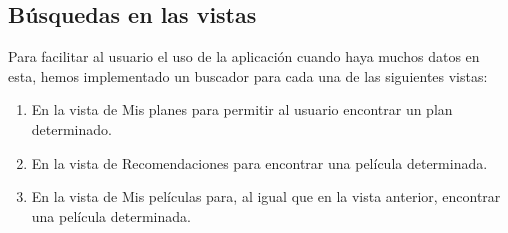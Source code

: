 \subsection{Búsquedas en las vistas}
Para facilitar al usuario el uso de la aplicación cuando haya muchos datos en esta, hemos implementado un buscador para cada una de las siguientes vistas:
\begin{enumerate}
    \item En la vista de Mis planes para permitir al usuario encontrar un plan determinado.
    \item En la vista de Recomendaciones para encontrar una película determinada.
    \item En la vista de Mis películas para, al igual que en la vista anterior, encontrar una película determinada.
\end{enumerate}
